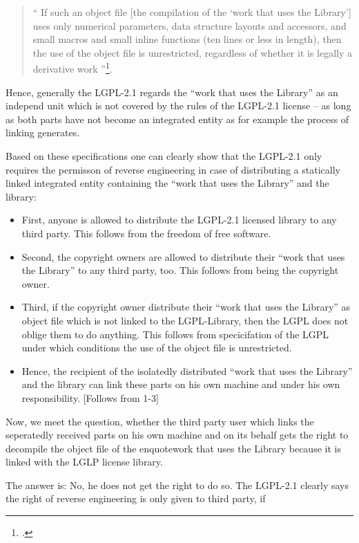 \begin{quote}\enquote{ If such an object file [the compilation of the
\enquote{work that uses the Library}] uses only numerical parameters, data structure
layouts and accessors, and small macros and small inline functions (ten lines or
less in length), then the use of the object file is unrestricted, regardless of
whether it is legally a derivative work }\footcite[cf.][\nopage wp
§5]{Lgpl21OsiLicense1999a}.
\end{quote}

Hence, generally the LGPL-2.1 regards the \enquote{work that uses the Library}
as an independ unit which is not covered by the rules of the LGPL-2.1 license --
as long as both parts have not become an integrated entity as for example the
process of linking generates.

Based on these specifications one can clearly show that the LGPL-2.1 only
requires the permisson of reverse engineering in case of distributing a
statically linked integrated entity containing the \enquote{work that uses the
Library} and the library:

\begin{itemize}
\item First, anyone is allowed to distribute the LGPL-2.1 licensed library to
any third party. This follows from the freedom of free software.

\item Second, the copyright owners are allowed to distribute their \enquote{work
that uses the Library} to any third party, too. This follows from being the copyright
owner.

\item Third, if the copyright owner distribute their \enquote{work that
uses the Library} as object file which is not linked to the LGPL-Library, then
the LGPL does not oblige them to do anything. This follows from specicifation of
the LGPL under which conditions the use of the object file is unrestricted.

\item Hence, the recipient of the isolatedly distributed \enquote{work
that uses the Library} and the library can link these parts on his own machine
and under his own responsibility. [Follows from 1-3]
\end{itemize}

Now, we meet the question, whether the third party user which links the
seperatedly received parts on his own machine and on its behalf gets the right
to decompile the object file of the enquote{work that uses the Library} because it
is linked with the LGLP license library.

The answer is: No, he does not get the right to do so. The LGPL-2.1 clearly says
the right of reverse engineering is only given to third party, if 

%

